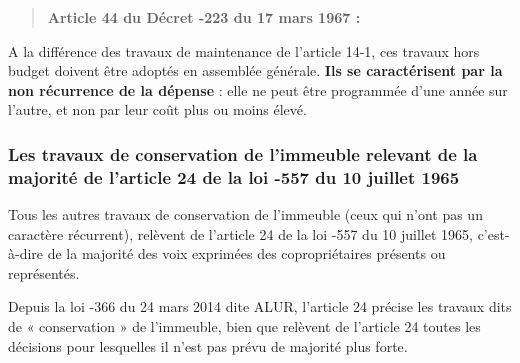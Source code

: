 				\begin{quote}
					\textbf{Article 44 du Décret -223 du 17 mars 1967 :}
					
				\end{quote}
				
				A la différence des travaux de maintenance de l’article 14-1, ces travaux hors budget doivent être adoptés en assemblée générale. \textbf{Ils se caractérisent par la non récurrence de la dépense} : elle ne peut être programmée d’une année sur l’autre, et non par leur coût plus ou moins élevé.
		
		\subsubsection{Les travaux de conservation de l’immeuble relevant de la majorité de l’article 24 de la loi -557 du 10 juillet 1965}
		
			Tous les autres travaux de conservation de l’immeuble (ceux qui n’ont pas un caractère récurrent), relèvent de l’article 24 de la loi -557 du 10 juillet 1965, c’est-à-dire de la majorité des voix exprimées des copropriétaires présents ou représentés.
			
			Depuis la loi -366 du 24 mars 2014 dite ALUR, l’article 24 précise les travaux dits de « conservation » de l’immeuble, bien que relèvent de l’article 24 toutes les décisions pour lesquelles il n’est pas prévu de majorité plus forte.
			
